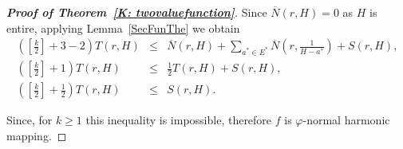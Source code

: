 \documentclass[11pt, reqno]{amsart}
\numberwithin{equation}{section}
\theoremstyle{definition}
\theoremstyle{remark}
\theoremstyle{plain}
\begin{document}
\begin{proof}[\bf{Proof of Theorem~\ref{K: twovaluefunction}}]
Since $\overline{N}(r,H)=0$ as $H$ is entire, applying 
Lemma~\ref{SecFunThe} we obtain
\begin{eqnarray*}
  \left(\left[\frac{k}{2}\right]+3-2\right)T(r,H) 
  &\leq &\overline{N}(r,H) +\sum_{a^* \in E^*}
  \overline{N}\left(r,\frac{1}{H-a^*}\right) +S(r,H), \\
  \left(\left[\frac{k}{2}\right]+1\right)T(r,H)&\leq& 
  \frac{1}{2}T(r,H)+S(r,H),  \\
  \left(\left[\frac{k}{2}\right]+\frac{1}{2}\right)
  T(r,H) &\leq& S(r,H).
\end{eqnarray*} 

Since, for $k\geq 1$ this inequality is impossible, therefore $f$ 
is $\varphi$-normal harmonic mapping.
\end{proof}
\medskip
\end{document}
